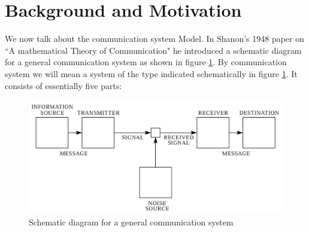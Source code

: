 \documentclass[12pt, oneside]{book}
\theoremstyle{definition}
\theoremstyle{definition}
\theoremstyle{remark}
\begin{document}
\section{Background and Motivation}
We now talk about the communication system Model. In Shanon's 1948 paper on ``A mathematical Theory of Communication" he introduced a schematic diagram for a general communication system as shown in figure \ref{fig:comm_model}. By communication system we will mean a system of the type indicated schematically in figure \ref{fig:comm_model}. It consists of essentially five parts:
\begin{figure}
    \centering
    \includegraphics[width=0.75\linewidth]{Images/comm_model.png}
    \caption{Schematic diagram for a general communication system}
    \label{fig:comm_model}
\end{figure}
\end{document}
